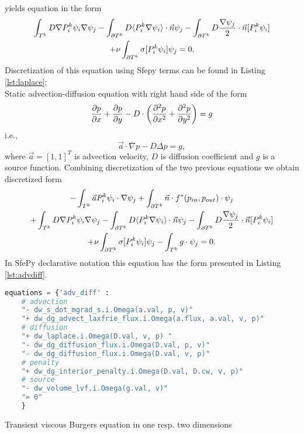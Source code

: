 yields equation in the form
\begin{multline}
    \int_{T^k} D\nabla P^k_i\psi_i \nabla \psi_j
    - \int_{\partial T^k} D \langle P^k_i\nabla\psi_i\rangle \cdot \vec{n}\psi_j 
    - \int_{\partial T^k} D \frac{\nabla \psi_j}{2}\cdot \vec{n} [P^k_i\psi_i] \\ 
    + \nu \int_{\partial T^k} \sigma [P^k_i\psi_i]\psi_j 
    = 0.
\end{multline}
Discretization of this equation using Sfepy terms can be found in Listing 
\ref{lst:laplace};\\
Static advection-diffusion equation with right hand side of the form
\begin{equation}
\label{eq:ex_advdiff}
\frac{\partial p}{\partial x} + \frac{\partial p}{\partial y} - D \cdot \left( \frac{\partial^2 p}{\partial x^2} + \frac{\partial^2 
p}{\partial y^2} \right) = g
\end{equation}
i.e.,
\begin{equation}
\vec{a} \cdot \nabla p - D \Delta p = g,
\end{equation}
where $\vec{a} = [1, 1]^T$ is advection velocity, $D$ is diffusion coefficient and $g$ is 
a source function. Combining discretization of the two previous equations we 
obtain 
discretized form
\begin{multline}
- \int_{T^k} \vec{a}P_i^k\psi_i\cdot\nabla\psi_j 
+ \int_{\partial{T^k}} \vec{n}\cdot f^{*} (p_{in}, p_{out})\cdot\psi_j\\
+ \int_{T^k} D\nabla P^k_i\psi_i \nabla \psi_j
- \int_{\partial T^k} D \langle P^k_i\nabla\psi_i\rangle \cdot \vec{n}\psi_j
- \int_{\partial T^k} D \frac{\nabla \psi_j}{2}\cdot \vec{n} [P^k_i\psi_i] \\
+ \nu \int_{\partial T^k} \sigma [P^k_i\psi_i]\psi_j
- \int_{T^k} g\cdot \psi_j
= 0.
\end{multline}
In SfePy declarative notation this equation has the form presented in 
Listing \ref{lst:advdiff}.
\setcounter{lstannotation}{0}
\begin{lstlisting}[language=Python, caption=Static advection-diffusion equation
\label{lst:advdiff}]
equations = {'adv_diff' :
    # advection
    "- dw_s_dot_mgrad_s.i.Omega(a.val, p, v)"
    "+ dw_dg_advect_laxfrie_flux.i.Omega(a.flux, a.val, v, p)"
    # diffusion
    "+ dw_laplace.i.Omega(D.val, v, p) "
    "- dw_dg_diffusion_flux.i.Omega(D.val, p, v)"
    "- dw_dg_diffusion_flux.i.Omega(D.val, v, p)"
    # penalty
    "+ dw_dg_interior_penalty.i.Omega(D.val, D.cw, v, p)"
    # source
    "- dw_volume_lvf.i.Omega(g.val, v)"
    "= 0"
    }
\end{lstlisting}
Transient viscous Burgers equation in one resp. two dimensions
